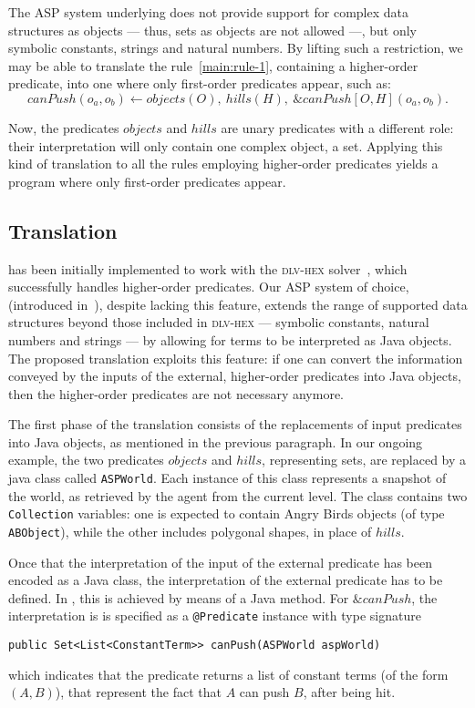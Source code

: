 The ASP system underlying \ah does not provide support for complex data structures as objects --- thus, sets as objects are not allowed ---, but only symbolic constants, strings and natural numbers.
By lifting such a restriction, we may be able to translate the rule~\eqref{main:rule-1}, containing a higher-order predicate, into one where only first-order predicates appear, such as:
$$ canPush(o_a,o_b) \leftarrow objects(O), \ hills(H), \ \&canPush[O,H](o_a,o_b). \label{main:rule-2} $$

Now, the predicates $objects$ and $hills$ are unary predicates with a different role: their interpretation will only contain one complex object, a set.
Applying this kind of translation to all the rules employing higher-order predicates yields a program where only first-order predicates appear.

\subsection{Translation}

\ah has been initially implemented to work with the \textsc{dlv-hex} solver~\cite{dlvHEX}, which successfully handles higher-order predicates.
Our ASP system of choice, \al (introduced in~\cite{blend}), despite lacking this feature, extends the range of supported data structures beyond those included in \textsc{dlv-hex} --- symbolic constants, natural numbers and strings --- by allowing for terms to be interpreted as Java objects.
The proposed translation exploits this feature: if one can convert the information conveyed by the inputs of the external, higher-order predicates into Java objects, then the higher-order predicates are not necessary anymore.

The first phase of the translation consists of the replacements of input predicates into Java objects, as mentioned in the previous paragraph.
In our ongoing example, the two predicates $objects$ and $hills$, representing sets, are replaced by a java class called \texttt{ASPWorld}.
Each instance of this class represents a snapshot of the world, as retrieved by the agent from the current level.
The class contains two \texttt{Collection} variables: one is expected to contain Angry Birds objects (of type \texttt{ABObject}), while the other includes polygonal shapes, in place of $hills$.

Once that the interpretation of the input of the external predicate has been encoded as a Java class, the interpretation of the external predicate has to be defined.
In \al, this is achieved by means of a Java method.
For $\&canPush$, the interpretation is  is specified as a \texttt{@Predicate} instance with type signature
\begin{center}
    \texttt{public Set<List<ConstantTerm>\-> canPush(ASPWorld aspWorld)}
\end{center}
which indicates that the predicate returns a list of constant terms (of the form \((A,B)\)), that represent the fact that \(A\) can push \(B\), after being hit.


